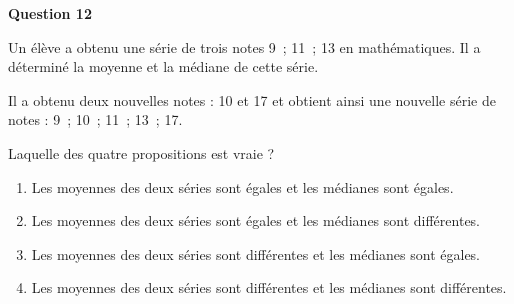 \documentclass[10pt]{article}
\begin{document}
\textbf{Question 12}
	
	Un élève a obtenu une série de trois notes 9~; 11~; 13 en mathématiques. Il a déterminé la moyenne et la médiane de cette série.
	
	Il a obtenu deux nouvelles notes : 10 et 17 et obtient ainsi une nouvelle série de notes : 9~; 10~; 11~; 13~; 17.
	
	Laquelle des quatre propositions est vraie ?
	
	\begin{enumerate}[label=\textbf{\alph* .}]
	\item Les moyennes des deux séries sont égales et les médianes sont égales.
	\item Les moyennes des deux séries sont égales et les médianes sont différentes.
	\item Les moyennes des deux séries sont différentes et les médianes sont égales.
	\item Les moyennes des deux séries sont différentes et les médianes sont différentes.
	\end{enumerate}
\end{document}
